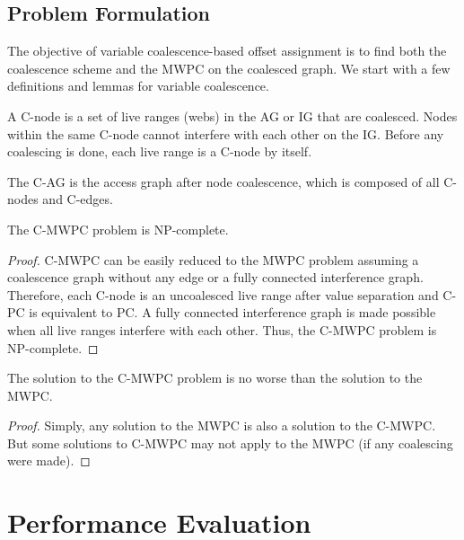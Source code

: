 \documentclass[format=acmsmall, review=false]{acmart}
\begin{document}
\subsection{Problem Formulation}

The objective of variable coalescence-based offset assignment is to find
both the coalescence scheme and the MWPC on the coalesced graph. We start
with a few definitions and lemmas for variable coalescence.

\begin{definition}A C-node is a set of
	live ranges (webs) in the AG or IG that are coalesced. Nodes within the same
	C-node cannot interfere with each other on the IG. Before any coalescing is
	done, each live range is a C-node by itself.
\end{definition}

\begin{definition}The C-AG is the access
	graph after node coalescence, which is composed of all C-nodes and C-edges.
\end{definition}

\begin{lemma}
	The C-MWPC problem is NP-complete.
\end{lemma}
\begin{proof} C-MWPC can be easily reduced to the MWPC problem assuming a
	coalescence graph without any edge or a fully connected interference graph.
	Therefore, each C-node is an uncoalesced live range after value separation
	and C-PC is equivalent to PC. A fully connected interference graph is made
	possible when all live ranges interfere with each other. Thus, the C-MWPC
	problem is NP-complete.
\end{proof}

\begin{lemma}The solution to the C-MWPC problem is no
	worse than the solution to the MWPC.
\end{lemma}
\begin{proof}
	Simply, any solution to the MWPC is also a solution to the
	C-MWPC. But some solutions to C-MWPC may not apply to the MWPC (if any
	coalescing were made).
\end{proof}

\section{Performance Evaluation}
\end{document}
